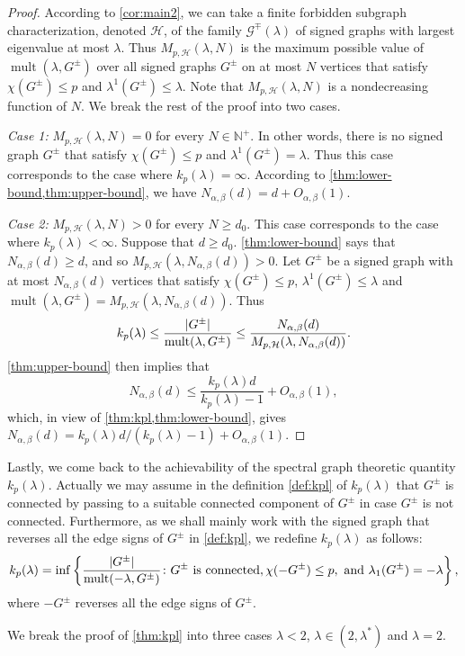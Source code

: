 \documentclass[11pt]{article}
\theoremstyle{definition}
\theoremstyle{remark}
\DeclarePairedDelimiter\abs{\lvert}{\rvert}
\newcommand{\dset}[2]{\left\{{#1}\colon{#2}\right\}}
\newcommand{\al}{\alpha}
\newcommand{\be}{\beta}
\newcommand{\la}{\lambda}
\newcommand{\kpl}{k_p(\la)}
\newcommand{\G}{\mathcal{G}}
\newcommand{\HH}{\mathcal{H}}
\newcommand{\N}{\mathbb{N}}
\newcommand{\Gsp}{\G^\mp(\la)}
\newcommand{\Nabd}{N_{\al,\be}(d)}
\newcommand{\mult}{\operatorname{mult}}
\begin{document}
\begin{proof}
    According to \cref{cor:main2}, we can take a finite forbidden subgraph characterization, denoted $\HH$, of the family $\Gsp$ of signed graphs with largest eigenvalue at most $\la$. Thus $M_{p, \HH}(\la, N)$ is the maximum possible value of $\mult(\la, G^\pm)$ over all signed graphs $G^\pm$ on at most $N$ vertices that satisfy $\chi(G^\pm) \le p$ and $\la^1(G^\pm) \le \la$. Note that $M_{p, \HH}(\la, N)$ is a nondecreasing function of $N$. We break the rest of the proof into two cases.

    \bigskip
    \noindent\textit{Case 1:} $M_{p, \HH}(\la, N) = 0$ for every $N \in \N^+$. In other words, there is no signed graph $G^\pm$ that satisfy $\chi(G^\pm) \le p$ and $\la^1(G^\pm) = \la$. Thus this case corresponds to the case where $\kpl = \infty$. According to \cref{thm:lower-bound,thm:upper-bound}, we have $\Nabd = d + O_{\al,\be}(1)$.

    \bigskip
    \noindent\textit{Case 2:} $M_{p, \HH}(\la, N) > 0$ for every $N \ge d_0$. This case corresponds to the case where $\kpl < \infty$. Suppose that $d \ge d_0$. \cref{thm:lower-bound} says that $\Nabd \ge d$, and so $M_{p, \HH}(\la, \Nabd) > 0$. Let $G^\pm$ be a signed graph with at most $N_{\al,\be}(d)$ vertices that satisfy $\chi(G^\pm) \le p$, $\la^1(G^\pm) \le \la$ and $\mult(\la, G^\pm) = M_{p, \HH}(\la, \Nabd)$. Thus
    \[
        \kpl \le \frac{\abs{G^\pm}}{\mult(\la, G^\pm)} \le \frac{\Nabd}{M_{p, \HH}(\la, \Nabd)}.
    \]
    \cref{thm:upper-bound} then implies that
    \[
        \Nabd \le \frac{\kpl d}{\kpl-1} + O_{\al,\be}(1),
    \]
    which, in view of \cref{thm:kpl,thm:lower-bound}, gives $\Nabd = \kpl d / (\kpl - 1) + O_{\al,\be}(1)$.
\end{proof}

Lastly, we come back to the achievability of the spectral graph theoretic quantity $\kpl$. Actually we may assume in the definition \eqref{def:kpl} of $\kpl$ that $G^\pm$ is connected by passing to a suitable connected component of $G^\pm$ in case $G^\pm$ is not connected. Furthermore, as we shall mainly work with the signed graph that reverses all the edge signs of $G^\pm$ in \eqref{def:kpl}, we redefine $\kpl$ as follows:
\[
    \kpl = \inf\dset{\frac{\abs{G^\pm}}{\mult(-\la, G^\pm)}}{G^\pm \text{ is connected}, \chi(-G^\pm) \le p, \text{ and }\la_1(G^\pm) = -\la},
\]
where $-G^\pm$ reverses all the edge signs of $G^\pm$.

We break the proof of \cref{thm:kpl} into three cases $\la < 2$, $\la \in (2, \la^*)$ and $\la = 2$.
\end{document}
